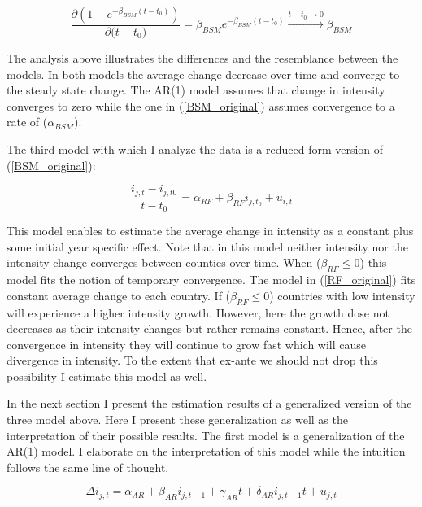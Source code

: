 \documentclass[]{amsart}
\begin{document}
\begin{equation}
\frac{\partial (1- e^{-\beta_{BSM}(t-t_0)})}{\partial {(t-t_0})} = \beta_{BSM} e^{-\beta_{BSM}(t-t_0)} \xrightarrow{t-t_0 \rightarrow 0} \beta_{BSM} 
\label{d_exp}
\end{equation}

The analysis above illustrates the differences and the resemblance between the models. In both models the average change decrease over time and converge to the steady state change. The AR(1) model assumes that change in intensity converges to zero while the one in (\ref{BSM_original}) assumes convergence to a rate of ($\alpha_{BSM}$).  

\bigskip

The third model with which I analyze the data is a reduced form version of (\ref{BSM_original}):

\begin{equation}
\frac{i_{j,t}-i_{j,t0}}{t-t_0}  = \alpha_{RF} +\beta_{RF} i_{j,t_0}+u_{i, t}
\label{RF_original}
\end{equation}

This model enables to estimate the average change in intensity as a constant plus some initial year specific effect. Note that in this model neither intensity nor the intensity change converges between counties over time. When ($\beta_{RF} \leq 0 $) this model fits the notion of temporary convergence. The model in (\ref{RF_original}) fits constant average change to each country. If ($\beta_{RF} \leq 0 $) countries with low intensity will experience a higher intensity growth. However, here the growth dose not decreases as their intensity changes but rather remains constant. Hence, after the convergence in intensity they will continue to grow fast which will cause divergence in intensity. To the extent that ex-ante we should not drop this possibility I estimate this model as well.

\bigskip

In the next section I present the estimation results of a generalized version of the three model above. Here I present these generalization as well as the interpretation of their possible results. The first model is a generalization of the AR(1) model. I elaborate on the interpretation of this model while the intuition follows the same line of thought.

\bigskip

\begin{equation}
\Delta i_{j,t} = \alpha_{AR}+ \beta_{AR} i_{j,t-1}+\gamma_{AR} t+\delta_{AR} i_{j,t-1}t+u_{j,t}
\label{dif_ar_full}
\end{equation}
\end{document}

